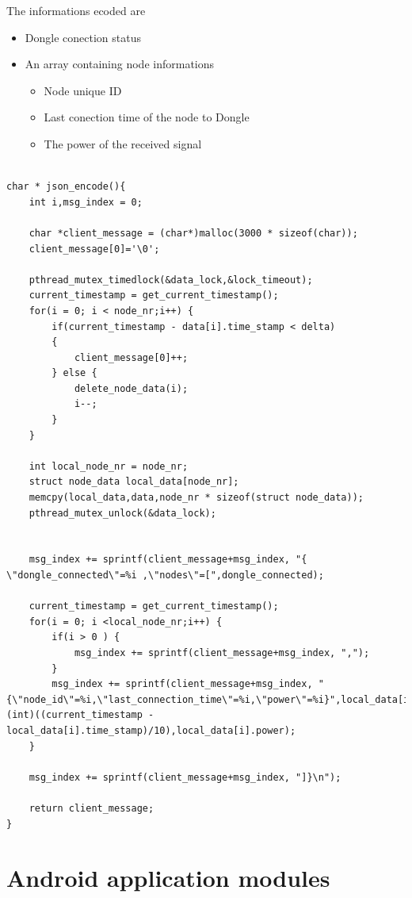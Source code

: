 The informations ecoded are
\begin{itemize}

\item Dongle conection status
\item An array containing node informations
\begin{itemize}

	\item Node unique ID
	\item Last conection time of the node to Dongle
	\item The power of the received signal

	\end{itemize}
\end{itemize}
\lstset{numbers=none, mathescape=true, nolol=false,caption=Data Collection use of mutex,label=lst:task}
\begin{lstlisting}

char * json_encode(){
	int i,msg_index = 0;

	char *client_message = (char*)malloc(3000 * sizeof(char));
	client_message[0]='\0';	

	pthread_mutex_timedlock(&data_lock,&lock_timeout); 
    current_timestamp = get_current_timestamp();
	for(i = 0; i < node_nr;i++) {
		if(current_timestamp - data[i].time_stamp < delta)
		{
			client_message[0]++;
		} else {
			delete_node_data(i);
			i--;
		}
	}
	
	int local_node_nr = node_nr;
	struct node_data local_data[node_nr];	
	memcpy(local_data,data,node_nr * sizeof(struct node_data));
	pthread_mutex_unlock(&data_lock);  
	

	msg_index += sprintf(client_message+msg_index, "{ \"dongle_connected\"=%i ,\"nodes\"=[",dongle_connected);
	
    current_timestamp = get_current_timestamp();
	for(i = 0; i <local_node_nr;i++) {
		if(i > 0 ) {
			msg_index += sprintf(client_message+msg_index, ",");
		}	
		msg_index += sprintf(client_message+msg_index, "{\"node_id\"=%i,\"last_connection_time\"=%i,\"power\"=%i}",local_data[i].id,(int)((current_timestamp - local_data[i].time_stamp)/10),local_data[i].power);	
	}

	msg_index += sprintf(client_message+msg_index, "]}\n");

	return client_message;
}
\end{lstlisting}

\section{Android application modules}


